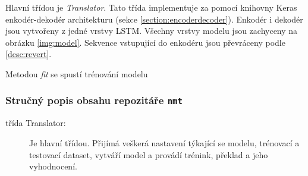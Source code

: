 Hlavní třídou je \emph{Translator}. Tato třída implementuje za pomocí knihovny Keras enkodér-dekodér architekturu (sekce \ref{section:encoderdecoder}). Enkodér i dekodér jsou vytvořeny z jedné vrstvy LSTM. Všechny vrstvy modelu jsou zachyceny na obrázku \ref{img:model}. Sekvence vstupující do enkodéru jsou převráceny podle \ref{desc:revert}.

Metodou \emph{fit} se spustí trénování modelu 



\subsubsection{Stručný popis obsahu repozitáře \texttt{nmt}}
\begin{description}
  \item[třída Translator:] Je hlavní třídou. Přijímá veškerá nastavení týkající se modelu, trénovací a testovací dataset, vytváří model a provádí trénink, překlad a jeho vyhodnocení.


\end{description}
